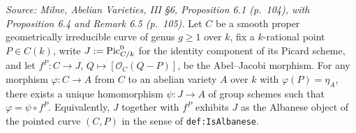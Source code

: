 \begin{theorem}
  \label{thm:albanese_universal_property}
  
  \textit{Source: Milne, Abelian Varieties, III \S 6, Proposition 6.1 (p.~104), with Proposition 6.4 and Remark 6.5 (p.~105).}
  Let \(C\) be a smooth proper geometrically irreducible curve of genus \(g \geq 1\) over \(k\), fix a \(k\)-rational point \(P \in C(k)\), write \(J := \operatorname{Pic}^0_{C/k}\) for the identity component of its Picard scheme, and let \(f^P \colon C \to J\), \(Q \mapsto [\mathcal O_C(Q - P)]\), be the Abel--Jacobi morphism. For any morphism \(\varphi \colon C \to A\) from \(C\) to an abelian variety \(A\) over \(k\) with \(\varphi(P) = \eta_A\), there exists a unique homomorphism \(\psi \colon J \to A\) of group schemes such that \(\varphi = \psi \circ f^P\). Equivalently, \(J\) together with \(f^P\) exhibits \(J\) as the Albanese object of the pointed curve \((C, P)\) in the sense of \texttt{def:IsAlbanese}.
\end{theorem}
